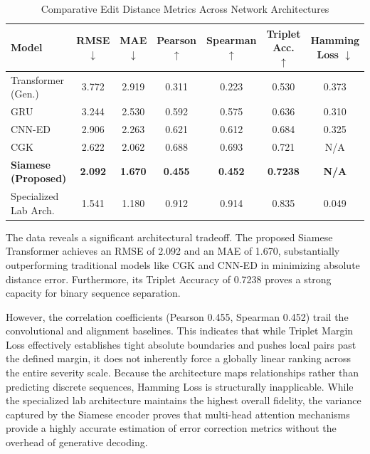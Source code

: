 \documentclass[12pt, letterpaper]{article}
\begin{document}
\begin{table}[H]
\centering
\caption{Comparative Edit Distance Metrics Across Network Architectures}
\vspace{0.2cm}
\begin{tabular}{lcccccc}
\toprule
\textbf{Model} & \textbf{RMSE} $\downarrow$ & \textbf{MAE} $\downarrow$ & \textbf{Pearson} $\uparrow$ & \textbf{Spearman} $\uparrow$ & \textbf{Triplet Acc.} $\uparrow$ & \textbf{Hamming Loss} $\downarrow$ \\ 
\midrule
Transformer (Gen.) & 3.772 & 2.919 & 0.311 & 0.223 & 0.530 & 0.373 \\ 
GRU & 3.244 & 2.530 & 0.592 & 0.575 & 0.636 & 0.310 \\ 
CNN-ED & 2.906 & 2.263 & 0.621 & 0.612 & 0.684 & 0.325 \\ 
CGK & 2.622 & 2.062 & 0.688 & 0.693 & 0.721 & N/A \\ 
\textbf{Siamese (Proposed)} & \textbf{2.092} & \textbf{1.670} & \textbf{0.455} & \textbf{0.452} & \textbf{0.7238} & \textbf{N/A} \\ 
Specialized Lab Arch. & 1.541 & 1.180 & 0.912 & 0.914 & 0.835 & 0.049 \\ 
\bottomrule
\end{tabular}
\label{tab:baselines}
\end{table}

The data reveals a significant architectural tradeoff. The proposed Siamese Transformer achieves an RMSE of 2.092 and an MAE of 1.670, substantially outperforming traditional models like CGK and CNN-ED in minimizing absolute distance error. Furthermore, its Triplet Accuracy of 0.7238 proves a strong capacity for binary sequence separation. 

However, the correlation coefficients (Pearson 0.455, Spearman 0.452) trail the convolutional and alignment baselines. This indicates that while Triplet Margin Loss effectively establishes tight absolute boundaries and pushes local pairs past the defined margin, it does not inherently force a globally linear ranking across the entire severity scale. Because the architecture maps relationships rather than predicting discrete sequences, Hamming Loss is structurally inapplicable. While the specialized lab architecture maintains the highest overall fidelity, the variance captured by the Siamese encoder proves that multi-head attention mechanisms provide a highly accurate estimation of error correction metrics without the overhead of generative decoding.
\end{document}
